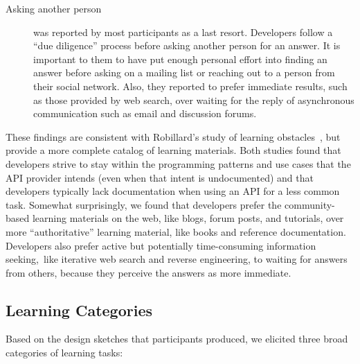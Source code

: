 \begin{description}
\item[Asking another person] was reported by most participants as a last resort. Developers follow a ``due diligence'' process before asking another person for an answer. It is important to them to have put enough personal effort into finding an answer before asking on a mailing list or reaching out to a person from their social network. 
Also, they reported to prefer immediate results, such as those provided by web search, over waiting for the reply of asynchronous communication such as email and discussion forums.

\end{description}

These findings are consistent with Robillard's study of learning obstacles~\cite{robillard09}, but provide a more complete catalog of learning materials. Both studies found that developers strive to stay within the programming patterns and use cases that the API provider intends (even when that intent is undocumented) and that developers typically lack documentation when using an API for a less common task. Somewhat surprisingly, we found that developers prefer the community-based learning materials on the web, like blogs, forum posts, and tutorials, over more ``authoritative'' learning material, like books and reference documentation. Developers also prefer active but potentially time-consuming information seeking,~like iterative web search and reverse engineering, to waiting for answers from others, because they perceive the answers as more immediate.

\moarsauce
\subsection{Learning Categories}


Based on the design sketches that participants produced, we elicited three broad categories of learning tasks:

